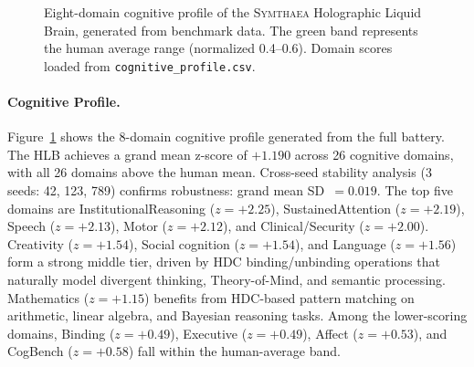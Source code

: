 \documentclass[11pt,letterpaper]{article}
\newcommand{\symthaea}{\textsc{Symthaea}}
\newcommand{\hlb}{\textsc{HLB}}
\begin{document}
\begin{figure}[t]
\caption{Eight-domain cognitive profile of the \symthaea{} Holographic Liquid Brain, generated from benchmark data. The green band represents the human average range (normalized 0.4--0.6). Domain scores loaded from \texttt{cognitive\_profile.csv}.}
\label{fig:radar}
\end{figure}

\paragraph{Cognitive Profile.} Figure~\ref{fig:radar} shows the 8-domain cognitive profile generated from the full battery. The \hlb{} achieves a grand mean z-score of $+1.190$ across 26 cognitive domains, with all 26 domains above the human mean. Cross-seed stability analysis (3 seeds: 42, 123, 789) confirms robustness: grand mean SD~$= 0.019$. The top five domains are InstitutionalReasoning ($z = +2.25$), SustainedAttention ($z = +2.19$), Speech ($z = +2.13$), Motor ($z = +2.12$), and Clinical/Security ($z = +2.00$). Creativity ($z = +1.54$), Social cognition ($z = +1.54$), and Language ($z = +1.56$) form a strong middle tier, driven by HDC binding/unbinding operations that naturally model divergent thinking, Theory-of-Mind, and semantic processing. Mathematics ($z = +1.15$) benefits from HDC-based pattern matching on arithmetic, linear algebra, and Bayesian reasoning tasks. Among the lower-scoring domains, Binding ($z = +0.49$), Executive ($z = +0.49$), Affect ($z = +0.53$), and CogBench ($z = +0.58$) fall within the human-average band.
\end{document}
